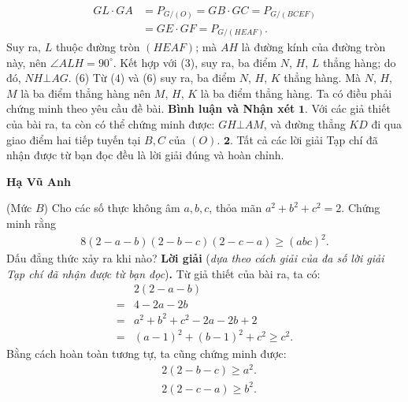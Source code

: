\begin{multicols}{2}
	\begin{align*}
		GL \cdot GA &= {P_{G/(O)}} = GB \cdot GC = {P_{G/(BCEF)}} \\
		&= GE \cdot GF = {P_{G/(HEAF)}}.
	\end{align*}
	Suy ra, $L$ thuộc đường tròn $(HEAF)$; mà $AH$ là đường kính của đường tròn này, nên $\angle ALH = 90^\circ$. Kết hợp với ($3$), suy ra, ba điểm $N$, $H$, $L$ thẳng hàng; do đó, \linebreak$NH \bot AG$. \hfill ($6$)
	\vskip 0.05cm
	Từ ($4$) và ($6$) suy ra, ba điểm $N$, $H$, $K$ thẳng hàng. Mà $N$, $H$, $M$ là ba điểm thẳng hàng nên $M$, $H$, $K$ là ba điểm thẳng hàng. Ta có điều phải chứng minh theo yêu cầu đề bài.
	\vskip 0.05cm
	\textbf{\color{thachthuctoanhoc}Bình luận và Nhận xét}
	\vskip 0.05cm
	$\pmb{1.}$ Với các giả thiết của bài ra, ta còn có thể chứng minh được: $GH \bot AM$, và đường thẳng $KD$ đi qua giao điểm hai tiếp tuyến tại $B, C$ của $(O)$.
	\vskip 0.05cm
	$\pmb{2.}$ Tất cả các lời giải Tạp chí đã nhận được từ bạn đọc đều là lời giải đúng và hoàn chỉnh.
	\begin{flushright}
		\textbf{\color{thachthuctoanhoc}Hạ Vũ Anh}
	\end{flushright}
	{}
	(Mức $B$) Cho các số thực không âm $a, b, c$, thỏa mãn $a^2 + b^2 + c^2 =2$.  Chứng minh rằng
	\begin{align*}
		8\left( {2 \!-\! a \!-\! b} \right)\left( {2 \!-\! b \!-\! c} \right)\left( {2 \!-\! c \!-\! a} \right) \ge {\left( {abc} \right)^2}.
	\end{align*}
	Dấu đẳng thức xảy ra khi nào?
	\vskip 0.05cm
	\textbf{\color{thachthuctoanhoc}Lời giải} (\textit{dựa theo cách giải của đa số lời giải Tạp chí đã nhận được từ bạn đọc})\textbf{\color{thachthuctoanhoc}.}
	\vskip 0.05cm
	Từ giả thiết của bài ra, ta có:
	\begin{align*}
		&2\left( {2 - a - b} \right) \\
		= &4 - 2a - 2b \\
		= &{a^2} + {b^2} + {c^2} - 2a - 2b + 2 \\
		= &{\left( {a - 1} \right)^2} + {\left( {b - 1} \right)^2} + {c^2} \ge {c^2}. \tag{$1$}
	\end{align*}
	Bằng cách hoàn toàn tương tự, ta cũng chứng minh được:
	\begin{align*}
		&2\left( {2 - b - c} \right) \ge {a^2}.\tag{$2$}\\
		&2\left( {2 - c - a} \right) \ge {b^2}.\tag{$3$}
	\end{align*}

\end{multicols}
